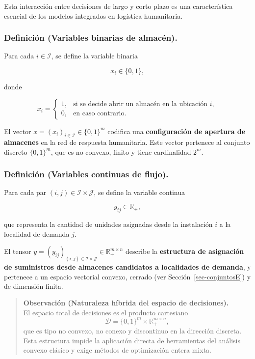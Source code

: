 \documentclass[
  spanish,
  us-letterpaper,
]{scrreprt}
\numberwithin{equation}{section}
\begin{document}
Esta interacción entre decisiones de largo y corto plazo es una
característica esencial de los modelos integrados en logística
humanitaria.

\subsubsection{\texorpdfstring{\textbf{Definición (Variables binarias de
almacén).}}{Definición (Variables binarias de almacén).}}\label{definiciuxf3n-variables-binarias-de-almacuxe9n.}

Para cada \(i \in \mathcal{I}\), se define la variable binaria

\[
x_i \in \{0,1\},
\]

donde

\[
x_i =
\begin{cases}
1, & \text{si se decide abrir un almacén en la ubicación } i, \\
0, & \text{en caso contrario}.
\end{cases}
\]

El vector \(x = (x_i)_{i \in \mathcal{I}} \in \{0,1\}^m\) codifica una
\textbf{configuración de apertura de almacenes} en la red de respuesta
humanitaria. Este vector pertenece al conjunto discreto \(\{0,1\}^m\),
que es no convexo, finito y tiene cardinalidad \(2^m\).

\subsubsection{\texorpdfstring{\textbf{Definición (Variables continuas
de
flujo).}}{Definición (Variables continuas de flujo).}}\label{definiciuxf3n-variables-continuas-de-flujo.}

Para cada par \((i,j) \in \mathcal{I} \times \mathcal{J}\), se define la
variable continua

\[
y_{ij} \in \mathbb{R}_+,
\]

que representa la cantidad de unidades asignadas desde la instalación
\(i\) a la localidad de demanda \(j\).

El tensor
\(y = (y_{ij})_{(i,j) \in \mathcal{I} \times \mathcal{J}} \in \mathbb{R}_+^{m \times n}\)
describe la \textbf{estructura de asignación de suministros desde
almacenes candidatos a localidades de demanda}, y pertenece a un espacio
vectorial convexo, cerrado (ver Sección~\ref{sec-conjuntosE}) y de
dimensión finita.

\begin{quote}
\textbf{Observación (Naturaleza híbrida del espacio de decisiones).}\\
El espacio total de decisiones es el producto cartesiano\\
\[
\mathcal{D} = \{0,1\}^m \times \mathbb{R}_+^{m \times n},
\] que es tipo no convexo, no conexo y discontinuo en la dirección
discreta. Esta estructura impide la aplicación directa de herramientas
del análisis convexo clásico y exige métodos de optimización entera
mixta.
\end{quote}
\end{document}
